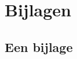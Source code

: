 
\chapter*{Bijlagen} %
\label{sec:een-titel}

\appendix

\renewcommand{\thesubsection}{\Alph{subsection}}

\section{Een bijlage} %
\label{sub:nog-een-titel}

\lipsum[1]
